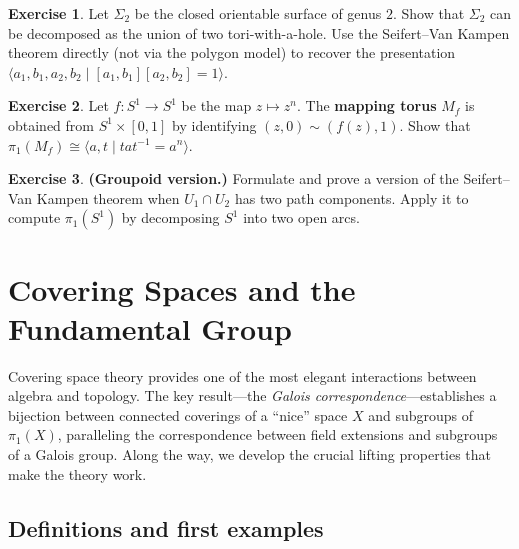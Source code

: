 \documentclass[12pt,a4paper,openany]{book}
\theoremstyle{definition}
\newtheorem{exercise}{Exercise}[chapter]
\theoremstyle{plain}
\theoremstyle{remark}
\begin{document}
\begin{exercise}\label{exo:svk-genus2}
  Let $\Sigma_2$ be the closed orientable surface of genus $2$.  Show that
  $\Sigma_2$ can be decomposed as the union of two tori-with-a-hole.  Use
  the Seifert--Van Kampen theorem directly (not via the polygon model) to
  recover the presentation
  $\langle a_1, b_1, a_2, b_2 \mid [a_1, b_1][a_2, b_2] = 1 \rangle$.
\end{exercise}

\begin{exercise}\label{exo:svk-mapping-torus}
  Let $f\colon S^1 \to S^1$ be the map $z \mapsto z^n$.  The
  \textbf{mapping torus} $M_f$ is obtained from $S^1 \times [0,1]$ by
  identifying $(z,0) \sim (f(z), 1)$.  Show that
  $\pi_1(M_f) \cong \langle a, t \mid t a t^{-1} = a^n \rangle$.
\end{exercise}

\begin{exercise}\label{exo:svk-groupoid}
  \textbf{(Groupoid version.)}
  Formulate and prove a version of the Seifert--Van Kampen theorem when
  $U_1 \cap U_2$ has two path components.  Apply it to compute
  $\pi_1(S^1)$ by decomposing $S^1$ into two open arcs.
\end{exercise}


\chapter{Covering Spaces and the Fundamental Group}\label{ch:coverings}

Covering space theory provides one of the most elegant interactions between
algebra and topology.  The key result---the \emph{Galois
correspondence}---establishes a bijection between
connected coverings of a ``nice'' space $X$ and subgroups of $\pi_1(X)$,
paralleling the correspondence between field extensions and subgroups of a
Galois group.  Along the way, we develop the crucial lifting properties that
make the theory work.

\section{Definitions and first examples}\label{sec:covering-def}
\end{document}
